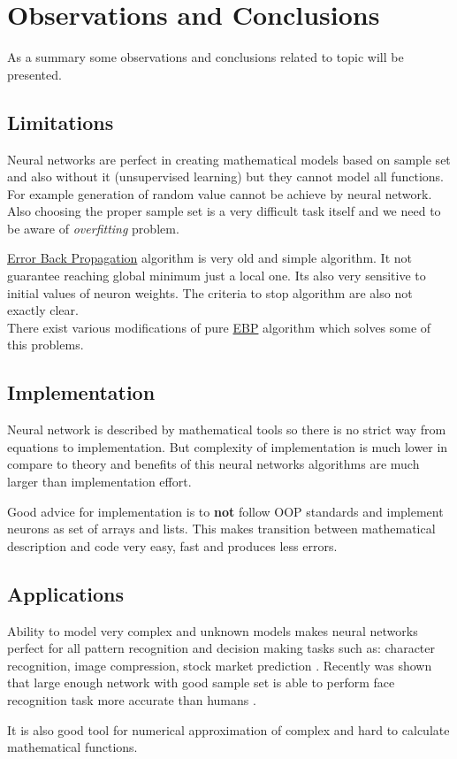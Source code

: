 \section{Observations and Conclusions}
\label{ObservationsConclusions}

As a summary some observations and conclusions related to topic will be presented.

\subsection{Limitations} 
\label{Limitations}

 \cite{mlpPawelRosczak} Neural networks are perfect in creating mathematical models based on sample set and also without it (unsupervised learning) but they cannot model all functions. For example generation of random value cannot be achieve by neural network. Also choosing the proper sample set is a very difficult task itself and we need to be aware of \textit{overfitting} problem.

\hyperref[sec:Training]{Error Back Propagation} algorithm is very old and simple algorithm. It not guarantee reaching global minimum just a local one. Its also very sensitive to initial values of neuron weights. The criteria to stop algorithm are also not exactly clear. \\
There exist various modifications of pure \hyperref[sec:Training]{EBP} algorithm which solves some of this problems.

\subsection{Implementation}
\label{Implementation}

Neural network is described by mathematical tools so there is no strict way from equations to implementation.
But complexity of implementation is much lower in compare to theory and benefits of this neural networks algorithms are much larger than implementation effort.

Good advice for implementation is to \textbf{not} follow OOP standards and implement neurons as set of arrays and lists. This makes transition between mathematical description and code very easy, fast and produces less errors.


\subsection{Applications}
\label{Applications}

Ability to model very complex and unknown models makes neural networks perfect for all pattern recognition and decision making tasks such as: character recognition, image compression, stock market prediction \cite{fsmlpDwrSkrMk}. Recently was shown that large enough network with good sample set is able to perform face recognition task more accurate than humans \cite{facePR}.

It is also good tool for numerical approximation of complex and hard to calculate mathematical functions.